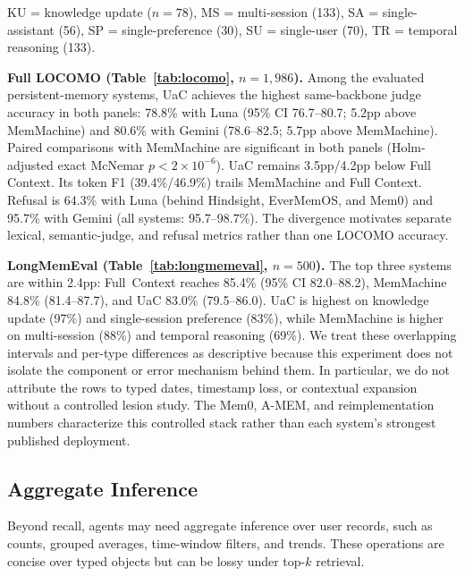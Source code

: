 \documentclass[letterpaper]{article} %
\begin{document}
\begin{table}[t]
\begin{minipage}[t]{0.46\textwidth}
{\vspace{2pt}
\raggedright KU = knowledge update ($n=78$), MS = multi-session (133), SA = single-assistant (56), SP = single-preference (30), SU = single-user (70), TR = temporal reasoning (133).\par
}
\caption{LongMemEval accuracy (\%) by question type on all 500 questions using Gemini~3 Flash.}
\label{tab:longmemeval}
\end{minipage}
\end{table}


\textbf{Full LOCOMO (Table~\ref{tab:locomo}, $n{=}1{,}986$).} Among the evaluated persistent-memory systems, UaC achieves the highest same-backbone judge accuracy in both panels: 78.8\% with Luna (95\% CI 76.7--80.7; 5.2pp above MemMachine) and 80.6\% with Gemini (78.6--82.5; 5.7pp above MemMachine). Paired comparisons with MemMachine are significant in both panels (Holm-adjusted exact McNemar $p{<}2\times10^{-6}$). UaC remains 3.5pp/4.2pp below Full Context. Its token F1 (39.4\%/46.9\%) trails MemMachine and Full Context. Refusal is 64.3\% with Luna (behind Hindsight, EverMemOS, and Mem0) and 95.7\% with Gemini (all systems: 95.7--98.7\%). The divergence motivates separate lexical, semantic-judge, and refusal metrics rather than one LOCOMO accuracy.

\textbf{LongMemEval (Table~\ref{tab:longmemeval}, $n{=}500$).} The top three systems are within 2.4pp: Full~Context reaches 85.4\% (95\% CI 82.0--88.2), MemMachine 84.8\% (81.4--87.7), and UaC 83.0\% (79.5--86.0). UaC is highest on knowledge update (97\%) and single-session preference (83\%), while MemMachine is higher on multi-session (88\%) and temporal reasoning (69\%). We treat these overlapping intervals and per-type differences as descriptive because this experiment does not isolate the component or error mechanism behind them. In particular, we do not attribute the rows to typed dates, timestamp loss, or contextual expansion without a controlled lesion study. The Mem0, A-MEM, and reimplementation numbers characterize this controlled stack rather than each system's strongest published deployment.

\subsection{Aggregate Inference}
\label{sec:analytical}

Beyond recall, agents may need aggregate inference over user records, such as counts, grouped averages, time-window filters, and trends. These operations are concise over typed objects but can be lossy under top-$k$ retrieval.
\end{document}
